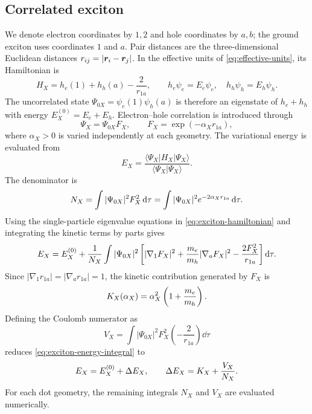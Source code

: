 \subsection{Correlated exciton}
\label{sec:exciton-model}

We denote electron coordinates by $1,2$ and hole coordinates by $a,b$; the
ground exciton uses coordinates $1$ and $a$. Pair distances are the
three-dimensional Euclidean distances $r_{ij}=|\bm{r}_i-\bm{r}_j|$. In the
effective units of \cref{eq:effective-units}, its Hamiltonian is
\begin{equation}
 H_X=h_e(1)+h_h(a)-\frac{2}{r_{1a}},
 \qquad
 h_e\psi_e=E_e\psi_e,\quad h_h\psi_h=E_h\psi_h.
 \label{eq:exciton-hamiltonian}
\end{equation}
The uncorrelated state $\Psi_{0X}=\psi_e(1)\psi_h(a)$ is therefore an
eigenstate of $h_e+h_h$ with energy $E_X^{(0)}=E_e+E_h$. Electron--hole
correlation is introduced through
\begin{equation}
 \Psi_X=\Psi_{0X}F_X,\qquad F_X=\exp(-\alpha_X r_{1a}),
 \label{eq:exciton-trial}
\end{equation}
where $\alpha_X>0$ is varied independently at each geometry. The variational
energy is evaluated from
\begin{equation}
 E_X=\frac{\langle\Psi_X|H_X|\Psi_X\rangle}
 {\langle\Psi_X|\Psi_X\rangle}.
 \label{eq:exciton-expectation}
\end{equation}
The denominator is
\begin{equation}
 N_X=\int
 |\Psi_{0X}|^2F_X^2\mathop{}\!\mathrm{d}\tau
 =\int|\Psi_{0X}|^2e^{-2\alpha_X r_{1a}}\mathop{}\!\mathrm{d}\tau .
 \label{eq:exciton-norm}
\end{equation}
Using the single-particle eigenvalue equations in
\cref{eq:exciton-hamiltonian} and integrating the kinetic terms by parts gives
\begin{equation}
 E_X=E_X^{(0)}+\frac{1}{N_X}\int|\Psi_{0X}|^2
 \left[|\nabla_1F_X|^2+\frac{m_e}{m_h}|\nabla_aF_X|^2
 -\frac{2F_X^2}{r_{1a}}\right]\mathop{}\!\mathrm{d}\tau .
 \label{eq:exciton-energy-integral}
\end{equation}
Since $|\nabla_1r_{1a}|=|\nabla_ar_{1a}|=1$, the kinetic contribution
generated by $F_X$ is
\begin{equation}
 K_X(\alpha_X)=
 \alpha_X^2\left(1+\frac{m_e}{m_h}\right).
 \label{eq:exciton-kinetic}
\end{equation}
Defining the Coulomb numerator as
\begin{equation}
 V_X=\int
 |\Psi_{0X}|^2F_X^2
 \left(-\frac{2}{r_{1a}}\right)\dd\tau
 \label{eq:exciton-coulomb}
\end{equation}
reduces \cref{eq:exciton-energy-integral} to
\begin{equation}
 E_X=E_X^{(0)}+\Delta E_X,\qquad
 \Delta E_X=K_X+\frac{V_X}{N_X}.
 \label{eq:exciton-energy}
\end{equation}
For each dot geometry, the remaining integrals $N_X$ and $V_X$ are evaluated
numerically.

